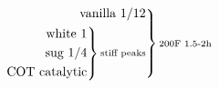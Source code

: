 \documentclass[12pt]{standalone}
\begin{document}
\[
\begin{rcases}\begin{alignedat}{3}
\text{vanilla 1/12}\\
\begin{rcases}\begin{alignedat}{3}
\text{white 1}\\
\text{sug 1/4}\\
\text{COT catalytic}\\
\end{alignedat}\end{rcases}
\substack{\text{stiff peaks}}\\
\end{alignedat}\end{rcases}
\substack{\text{200F 1.5-2h}}\\
\]
\end{document}
